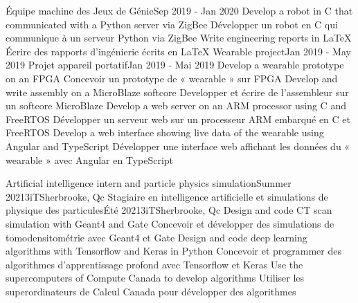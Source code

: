           {Équipe machine des Jeux de Génie}{Sep 2019 - Jan 2020}
            \resumeItemListStart
                \resumeItemEnFr
                    {Develop a robot in C that communicated with a Python server via ZigBee}
                    {Développer un robot en C qui communique à un serveur Python via ZigBee}
                \resumeItemEnFr
                    {Write engineering reports in LaTeX}
                    {Écrire des rapports d’ingénierie écrits en LaTeX}
            \resumeItemListEnd
      \resumeProjectHeadingEnFr
          {Wearable project}{Jan 2019 - May 2019}
          {Projet appareil portatif}{Jan 2019 - Mai 2019}
            \resumeItemListStart
                \resumeItemEnFr
                    {Develop a wearable prototype on an FPGA}
                    {Concevoir un prototype de « wearable » sur FPGA}
                \resumeItemEnFr
                    {Develop and write assembly on a MicroBlaze softcore}
                    {Developper et écrire de l'assembleur sur un softcore MicroBlaze}
                \resumeItemEnFr
                    {Develop a web server on an ARM processor using C and FreeRTOS}
                    {Développer un serveur web sur un processeur ARM embarqué en C et FreeRTOS}
                \resumeItemEnFr
                    {Develop a web interface showing live data of the wearable using Angular and TypeScript}
                    {Développer une interface web affichant les données du « wearable » avec Angular en TypeScript}
            \resumeItemListEnd
    \resumeSubHeadingListEnd

        \resumeSubHeadingListStart
        \resumeSubheadingEnFr
            {Artificial intelligence intern and particle physics simulation}{Summer 2021}{3iT}{Sherbrooke, Qc}
            {Stagiaire en intelligence artificielle et simulations de physique des particules}{Été 2021}{3iT}{Sherbrooke, Qc}
                \resumeItemListStart
                    \resumeItemEnFr
                        {Design and code CT scan simulation with Geant4 and Gate}
                        {Concevoir et développer des simulations de tomodensitométrie avec Geant4 et Gate}
                    \resumeItemEnFr
                        {Design and code deep learning algorithms with Tensorflow and Keras in Python}
                        {Concevoir et programmer des algorithmes d’apprentissage profond avec Tensorflow et Keras}
                    \resumeItemEnFr
                        {Use the supercomputers of Compute Canada to develop algorithms}
                        {Utiliser les superordinateurs de Calcul Canada pour développer des algorithmes}
                \resumeItemListEnd
    
